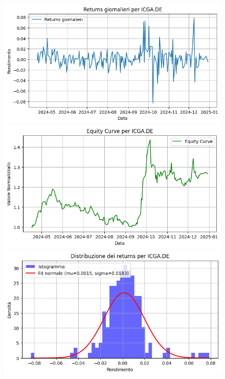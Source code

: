 \documentclass{article}%
\begin{document}
\begin{figure}[htbp]%
\begin{minipage}{0.31\textwidth}%
\includegraphics[width=\linewidth]{immagini_tickers/ICGA.DE_returns_plot.png}%
\end{minipage}%
\begin{minipage}{0.31\textwidth}%
\includegraphics[width=\linewidth]{immagini_tickers/ICGA.DE_equity_curve.png}%
\end{minipage}%
\begin{minipage}{0.31\textwidth}%
\includegraphics[width=\linewidth]{immagini_tickers/ICGA.DE_distribuzione_returns.png}%
\end{minipage}%
\end{figure}
\end{document}
